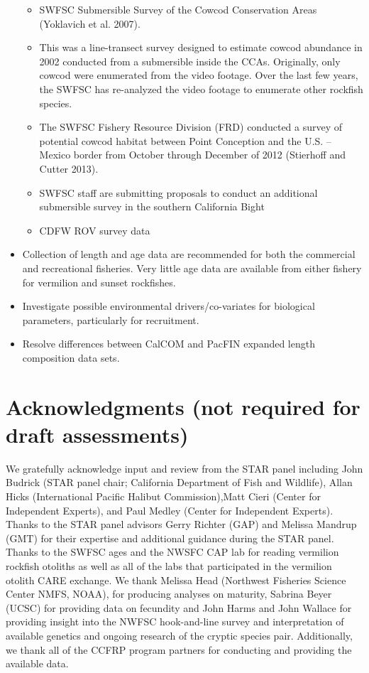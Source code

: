 \documentclass[
  english,
  a4paper,
]{article}
\providecommand{\tightlist}{%
  \setlength{\itemsep}{0pt}\setlength{\parskip}{0pt}}
\begin{document}
\begin{itemize}
  \begin{itemize}
  \tightlist
  \item
    SWFSC Submersible Survey of the Cowcod Conservation Areas (Yoklavich et al. 2007).
  \item
    This was a line-transect survey designed to estimate cowcod abundance in 2002
    conducted from a submersible inside the CCAs. Originally, only cowcod were enumerated from the video footage. Over the last few years, the SWFSC has re-analyzed the video footage to enumerate other rockfish species.
  \item
    The SWFSC Fishery Resource Division (FRD) conducted a survey of potential cowcod habitat between Point Conception and the U.S. -- Mexico border from October through December of 2012 (Stierhoff and Cutter 2013).
  \item
    SWFSC staff are submitting proposals to conduct an additional submersible survey in the southern California Bight
  \item
    CDFW ROV survey data
  \end{itemize}
\item
  Collection of length and age data are recommended for both the commercial and
  recreational fisheries. Very little age data are available from either fishery for
  vermilion and sunset rockfishes.
\item
  Investigate possible environmental drivers/co-variates for biological parameters,
  particularly for recruitment.
\item
  Resolve differences between CalCOM and PacFIN expanded length composition data sets.
\end{itemize}

\clearpage

\hypertarget{acknowledgments-not-required-for-draft-assessments}{%
\section{Acknowledgments (not required for draft assessments)}\label{acknowledgments-not-required-for-draft-assessments}}

We gratefully acknowledge input and review from the STAR panel including John
Budrick (STAR panel chair; California Department of Fish and Wildlife),
Allan Hicks (International Pacific Halibut Commission),Matt Cieri (Center for
Independent Experts), and Paul Medley (Center for Independent Experts). Thanks
to the STAR panel advisors Gerry Richter (GAP) and Melissa Mandrup (GMT) for
their expertise and additional guidance during the STAR panel.
Thanks to the SWFSC ages and the NWSFC CAP lab for reading vermilion rockfish otoliths as well as all of the labs that participated in the vermilion otolith CARE exchange. We thank Melissa Head (Northwest Fisheries Science Center NMFS, NOAA), for producing analyses on maturity, Sabrina Beyer (UCSC) for providing data on fecundity and John Harms and John Wallace for providing insight into the NWFSC hook-and-line survey and interpretation of available genetics and ongoing research of the cryptic species pair. Additionally, we thank all of the CCFRP program partners for conducting and providing the available data.
\end{document}
